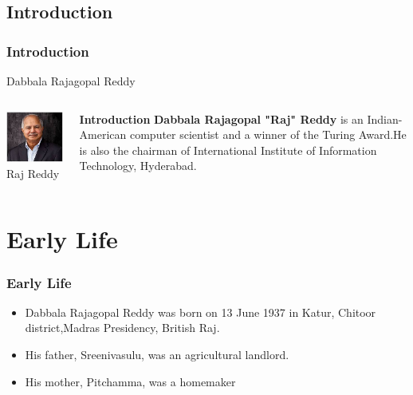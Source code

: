 \documentclass{beamer}
\begin{document}
\begin{frame}
 \section{Introduction}
 \transdissolve
 \frametitle{Introduction}
 \begin{block}{}
   Dabbala Rajagopal Reddy
 \end{block}

 \begin{columns}
  \begin{column}{0.35\textwidth}
   \begin{center}
     \includegraphics[scale=0.5]{raj.jpeg} \\
     Raj Reddy
   \end{center} 
   \end{column}
   
  \begin{column}{0.55\textwidth}
   \begin{block}{\bf Introduction}  
    {\bf Dabbala Rajagopal "Raj" Reddy} is an Indian-American computer 
    scientist and a winner of the Turing Award.He is also the chairman 
    of International Institute of Information Technology, Hyderabad.
    \end{block}
  \end{column}
 \end{columns}
\end{frame}

 \section{Early Life}
\begin{frame}
 \transblindshorizontal
  \frametitle{\bf Early Life}
  \begin{itemize}
   \item<1-> Dabbala Rajagopal Reddy was born on 13 June 1937 in Katur, Chitoor
   district,Madras Presidency, British Raj.
   \item<2-> His father, Sreenivasulu, was an agricultural landlord.
   \item<3-> His mother, Pitchamma, was a homemaker
  \end{itemize} 
\end{frame}
{\gdef\beamer@frametitle{}}
 
\end{document}
